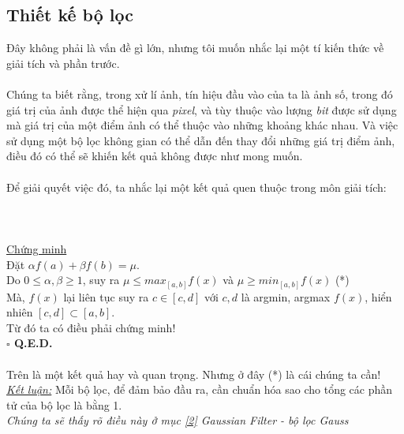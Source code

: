 \documentclass{article}
\begin{document}
        \subsection{Thiết kế bộ lọc}
        \label{1}
        Đây không phải là vấn đề gì lớn, nhưng tôi muốn nhắc lại một tí kiến thức về giải tích và phần trước.\\ \\
        Chúng ta biết rằng, trong xử lí ảnh, tín hiệu đầu vào của ta là ảnh số, trong đó giá trị của ảnh được thể hiện qua \textit{pixel}, và tùy thuộc vào lượng \textit{bit} được sử dụng mà giá trị của một điểm ảnh có thể thuộc vào những khoảng khác nhau. Và việc sử dụng một bộ lọc không gian có thể dẫn đến thay đổi những giá trị điểm ảnh, điều đó có thể sẽ khiến kết quả không được như mong muốn. \\ \\
        Để giải quyết việc đó, ta nhắc lại một kết quả quen thuộc trong môn giải tích: \\ \\
        \\ \\
        \underline{Chứng minh}\\
        Đặt $\alpha f(a) + \beta f(b) = \mu$. \\
        Do $0 \leq \alpha, \beta \geq 1$, suy ra $\mu \leq max_{[a,b]} f(x)$ và $\mu \geq min_{[a,b]} f(x)$ (*)\\
        Mà, $f(x)$ lại liên tục suy ra $ c \in [c, d]$ với $c, d$ là  argmin, argmax $f(x)$, hiển nhiên $ [c, d] \subset [a, b]$.\\
        Từ đó ta có điều phải chứng minh! \\  \textbf{$\square$ Q.E.D.}
        \\ \\Trên là một kết quả hay và quan trọng. Nhưng ở đây (*) là cái chúng ta cần! \\
        \underline{\textit{Kết luận:}} Mỗi bộ lọc, để đảm bảo đầu ra, cần chuẩn hóa sao cho tổng các phần tử của bộ lọc là bằng 1. \\
        \textit{Chúng ta sẽ thấy rõ điều này ở mục \ref{2} Gaussian Filter - bộ lọc Gauss}\\ \\
\end{document}
